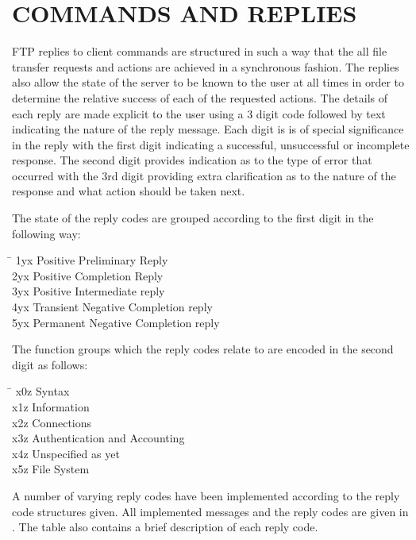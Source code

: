 \documentclass[10pt,twocolumn]{witseiepaper}
\begin{document}
%
\section{COMMANDS AND REPLIES}
\label{sec: Commands and Replies}

FTP replies to client commands are structured in such a way that the all file transfer requests and actions are achieved in a synchronous fashion. The replies also allow the state of the server to be known to the user at all times in order to determine the relative success of each of the requested actions. The details of each reply are made explicit to the user using a 3 digit code followed by text indicating the nature of the reply message. Each digit is is of special significance in the reply with the first digit indicating a successful, unsuccessful or incomplete response. The second digit provides indication as to the type of error that occurred with the 3rd digit providing extra clarification as to the nature of the response and what action should be taken next.

The state of the reply codes are grouped according to the first digit in the following way:
\begin{tabbing}
	\hspace{4em}\=\kill
	1yx	\> Positive Preliminary Reply \\ 
	2yx	\> Positive Completion Reply\\ 
	3yx	\> Positive Intermediate reply \\ 
	4yx	\> Transient Negative Completion reply \\ 
	5yx	\> Permanent Negative Completion reply
\end{tabbing} 

The function groups which the reply codes relate to are encoded in the second digit as follows: 

\begin{tabbing}
	\hspace{4em}\=\kill
	x0z	\> Syntax \\ 
	x1z	\> Information\\ 
	x2z	\> Connections\\ 
	x3z	\> Authentication and Accounting \\ 
	x4z	\> Unspecified as yet \\
	x5z \> File System
\end{tabbing} 

A number of varying reply codes have been implemented according to the reply code structures given. All implemented messages and the reply codes are given in . The table also contains a brief description of each reply code.
\end{document}
